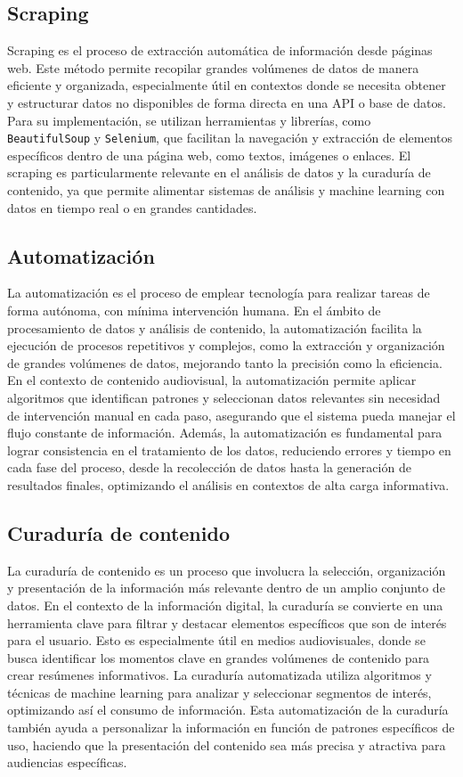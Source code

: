 \subsection{Scraping}
Scraping es el proceso de extracción automática de información desde páginas web. Este método permite recopilar grandes volúmenes de datos de manera eficiente y organizada, especialmente útil en contextos donde se necesita obtener y estructurar datos no disponibles de forma directa en una API o base de datos. Para su implementación, se utilizan herramientas y librerías, como \texttt{BeautifulSoup} y \texttt{Selenium}, que facilitan la navegación y extracción de elementos específicos dentro de una página web, como textos, imágenes o enlaces. El scraping es particularmente relevante en el análisis de datos y la curaduría de contenido, ya que permite alimentar sistemas de análisis y machine learning con datos en tiempo real o en grandes cantidades.

\subsection{Automatización}
La automatización es el proceso de emplear tecnología para realizar tareas de forma autónoma, con mínima intervención humana. En el ámbito de procesamiento de datos y análisis de contenido, la automatización facilita la ejecución de procesos repetitivos y complejos, como la extracción y organización de grandes volúmenes de datos, mejorando tanto la precisión como la eficiencia. En el contexto de contenido audiovisual, la automatización permite aplicar algoritmos que identifican patrones y seleccionan datos relevantes sin necesidad de intervención manual en cada paso, asegurando que el sistema pueda manejar el flujo constante de información. Además, la automatización es fundamental para lograr consistencia en el tratamiento de los datos, reduciendo errores y tiempo en cada fase del proceso, desde la recolección de datos hasta la generación de resultados finales, optimizando el análisis en contextos de alta carga informativa.

\subsection{Curaduría de contenido}
La curaduría de contenido es un proceso que involucra la selección, organización y presentación de la información más relevante dentro de un amplio conjunto de datos. En el contexto de la información digital, la curaduría se convierte en una herramienta clave para filtrar y destacar elementos específicos que son de interés para el usuario. Esto es especialmente útil en medios audiovisuales, donde se busca identificar los momentos clave en grandes volúmenes de contenido para crear resúmenes informativos. La curaduría automatizada utiliza algoritmos y técnicas de machine learning para analizar y seleccionar segmentos de interés, optimizando así el consumo de información. Esta automatización de la curaduría también ayuda a personalizar la información en función de patrones específicos de uso, haciendo que la presentación del contenido sea más precisa y atractiva para audiencias específicas.

